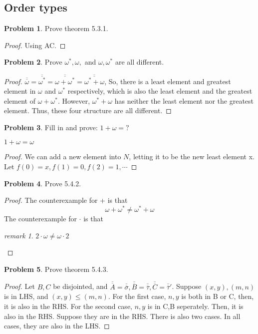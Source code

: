 \documentclass[a4paper,11pt]{article}%
\theoremstyle{remark}
\newtheorem*{remark}{remark}
\theoremstyle{definition}
\newtheorem{problem}{Problem}[subsection]
\begin{document}
\subsection{Order types}
\begin{problem}
    Prove theorem 5.3.1.
    \begin{proof}
        Using AC.
    \end{proof}
\end{problem}
\begin{problem}
    Prove $\omega^*,\omega,$ and $\omega,\omega^*$ are all different.
    \begin{proof}
        $\overline{\overline{\omega}}=\overline{\overline{\omega^*}}=\overline{\overline{\omega+\omega^*}}=\overline{\overline{\omega^*+\omega}}$,
        So, there is a least element and greatest element in $\omega$ and $\omega^*$ respectively,
        which is also the least element and the greatest element of $\omega+\omega^*$.
        However, $\omega^*+\omega$ has neither the least element nor the greatest element.
        Thus, these four structure are all different.
    \end{proof}
\end{problem}
\begin{problem}
    Fill in and prove: $1+\omega=?$
    
    $1+\omega=\omega$
    \begin{proof}
        We can add a new element into $N$, letting it to be the new least element x.
        Let $f(0)=x,f(1)=0,f(2)=1,\cdots$
    \end{proof}
\end{problem}
\begin{problem}
    Prove 5.4.2.
    \begin{proof}
        The counterexample for + is that 
        \[\omega+\omega^*\neq\omega^*+\omega\]
        The counterexample for $\cdot$ is that 
    \begin{remark}
        $2\cdot\omega\neq\omega\cdot 2$
    \end{remark}
    \end{proof}
\end{problem}
\begin{problem}
    Prove theorem 5.4.3.
    \begin{proof}
        Let $B,C$ be disjointed, and $\overline{\overline{A}}=\overline{\overline{\sigma}},
        \overline{\overline{B}}=\overline{\overline{\tau}},\overline{\overline{C}}=\overline{\overline{\tau}}'$.
        Suppose $(x,y),(m,n)$ is in LHS, and $(x,y)\leq(m,n)$.
        For the first case, $n,y$ is both in B or C, then, it is also in the RHS.
        For the second case, $n,y$ is in C,B seperately. Then, it is also in the RHS.
        Suppose they are in the RHS. There is also two cases. In all cases, they are also in the LHS.
    \end{proof}
\end{problem}
\end{document}
